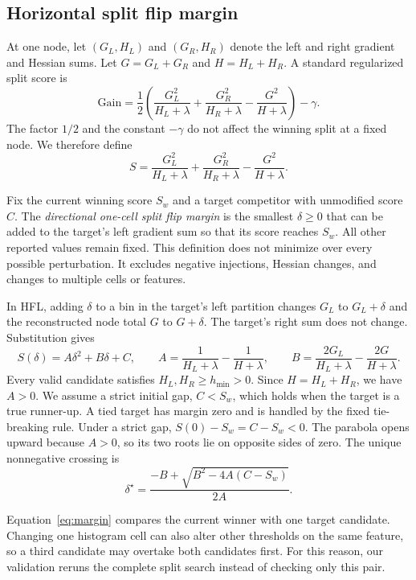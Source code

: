 \documentclass[11pt]{article}
\begin{document}
\subsection{Horizontal split flip margin}
\label{sec:marginmethod}

At one node, let $(G_L,H_L)$ and $(G_R,H_R)$ denote the left and right gradient and Hessian sums. Let $G=G_L+G_R$ and $H=H_L+H_R$. A standard regularized split score is
\begin{equation}
\mathrm{Gain}
=\frac{1}{2}\left(
\frac{G_L^2}{H_L+\lambda}
+\frac{G_R^2}{H_R+\lambda}
-\frac{G^2}{H+\lambda}
\right)-\gamma.
\label{eq:gain}
\end{equation}
The factor $1/2$ and the constant $-\gamma$ do not affect the winning split at a fixed node. We therefore define
\[
S=\frac{G_L^2}{H_L+\lambda}
+\frac{G_R^2}{H_R+\lambda}
-\frac{G^2}{H+\lambda}.
\]

Fix the current winning score $S_w$ and a target competitor with unmodified score $C$. The \emph{directional one-cell split flip margin} is the smallest $\delta\geq0$ that can be added to the target's left gradient sum so that its score reaches $S_w$. All other reported values remain fixed. This definition does not minimize over every possible perturbation. It excludes negative injections, Hessian changes, and changes to multiple cells or features.

In HFL, adding $\delta$ to a bin in the target's left partition changes $G_L$ to $G_L+\delta$ and the reconstructed node total $G$ to $G+\delta$. The target's right sum does not change. Substitution gives
\begin{equation}
S(\delta)=A\delta^2+B\delta+C,
\qquad
A=\frac{1}{H_L+\lambda}-\frac{1}{H+\lambda},
\qquad
B=\frac{2G_L}{H_L+\lambda}-\frac{2G}{H+\lambda}.
\label{eq:quadratic}
\end{equation}
Every valid candidate satisfies $H_L,H_R\geq h_{\min}>0$. Since $H=H_L+H_R$, we have $A>0$. We assume a strict initial gap, $C<S_w$, which holds when the target is a true runner-up. A tied target has margin zero and is handled by the fixed tie-breaking rule. Under a strict gap, $S(0)-S_w=C-S_w<0$. The parabola opens upward because $A>0$, so its two roots lie on opposite sides of zero. The unique nonnegative crossing is
\begin{equation}
\delta^\star
=\frac{-B+\sqrt{B^2-4A(C-S_w)}}{2A}.
\label{eq:margin}
\end{equation}

Equation~\ref{eq:margin} compares the current winner with one target candidate. Changing one histogram cell can also alter other thresholds on the same feature, so a third candidate may overtake both candidates first. For this reason, our validation reruns the complete split search instead of checking only this pair.
\end{document}
